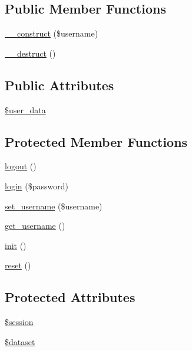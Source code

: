 \subsection*{Public Member Functions}
\begin{CompactItemize}
\item 
\hyperlink{classUserHandler_624054e9693139a3fe5af0ef3b757f04}{\_\-\_\-construct} (\$username)
\item 
\hyperlink{classUserHandler_3e1f6381ed79caf6e1a255fb0a9cc386}{\_\-\_\-destruct} ()
\end{CompactItemize}
\subsection*{Public Attributes}
\begin{CompactItemize}
\item 
\hyperlink{classUserHandler_e7a2d59eee65560ac96b860e828bb445}{\$user\_\-data}
\end{CompactItemize}
\subsection*{Protected Member Functions}
\begin{CompactItemize}
\item 
\hyperlink{classUserHandler_8000feaceda9d3c37fc56b6d1969b8f7}{logout} ()
\item 
\hyperlink{classUserHandler_7a0b269a54d9430f48d6490c1fe14ecd}{login} (\$password)
\item 
\hyperlink{classUserHandler_fbcc9a275b547cca0bd4cff567b054a0}{set\_\-username} (\$username)
\item 
\hyperlink{classUserHandler_76e8c8b88c8d92f2d03645e810b9253c}{get\_\-username} ()
\item 
\hyperlink{class__OWL_e0ef3ded56e8a6b34b6461e5a721cd3e}{init} ()
\item 
\hyperlink{class__OWL_2f2a042bcf31965194c03033df0edc9b}{reset} ()
\end{CompactItemize}
\subsection*{Protected Attributes}
\begin{CompactItemize}
\item 
\hyperlink{classUserHandler_f097b7fd1ee085b46a6c34e071508a7f}{\$session}
\item 
\hyperlink{classUserHandler_c38c1ea50b2820ed03781bdbe8eb2e08}{\$dataset}
\end{CompactItemize}

